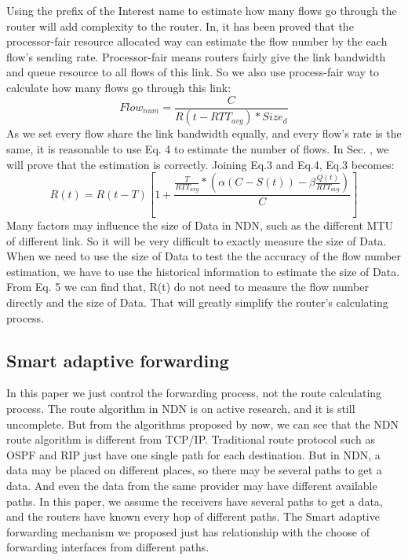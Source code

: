 Using the prefix of the Interest name to estimate how many flows go through the router will add complexity to the router. In\cite{RCP}, it has been proved that the processor-fair resource allocated way can estimate the flow number by the each flow's sending rate. Processor-fair means routers fairly give the link bandwidth and queue resource to all flows of this link. So we also use process-fair way to calculate how many flows go through this link:
\begin{equation}
Flow_{num}=\frac{C}{R(t-RTT_{avg})\ast{Size_{d}}}
\end{equation}
As we set every flow share the link bandwidth equally, and every flow's rate is the same, it is reasonable to use Eq. 4 to estimate the number of flows. In Sec. \uppercase\expandafter{}, we will prove that the estimation is correctly.
Joining Eq.3 and Eq.4, Eq.3 becomes:
\begin{equation}
R(t)=R(t-T)[1+\frac{\frac{T}{RTT_{avg}}\ast(\alpha(C-S(t))-\beta\frac{Q(t)}{RTT_{avg}})}{C}]
\end{equation}
Many factors may influence the size of Data in NDN, such as the different MTU of different link. So it will be very difficult to exactly measure the size of Data. When we need to use the size of Data to test the the accuracy of the flow number estimation, we have to use the historical information to estimate the size of Data. From Eq. 5 we can find that, R(t) do not need to measure the flow number directly and the size of Data. That will greatly simplify the router's calculating process.
\subsection{Smart adaptive forwarding}
In this paper we just control the forwarding process, not the route calculating process. The route algorithm in NDN is on active research, and it is still uncomplete. But from the algorithms proposed by now, we can see that the NDN route algorithm is different from TCP/IP\cite{ndnroute}. Traditional route protocol such as OSPF and RIP just have one single path for each destination. But in NDN, a data may be placed on different places, so there may be several paths to get a data. And even the data from the same provider may have different available paths. In this paper, we assume the receivers have several paths to get a data, and the routers have known every hop of different paths. The Smart adaptive forwarding mechanism we proposed just has relationship with the choose of forwarding interfaces from different paths.

